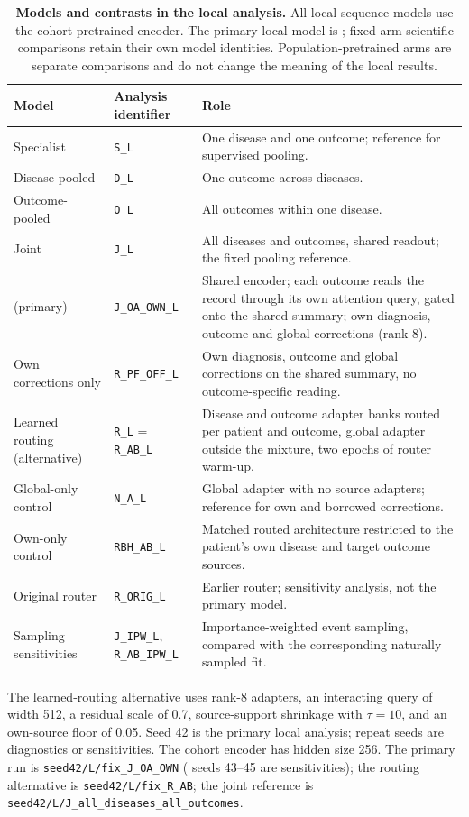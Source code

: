\begin{table}[htbp]
\centering\small
\caption{\textbf{Models and contrasts in the local analysis.}
All local sequence models use the cohort-pretrained encoder. The primary
local model is \opera{}; fixed-arm scientific comparisons retain their own
model identities. Population-pretrained arms are separate comparisons and do
not change the meaning of the local results.}
\label{tab:model-identity}
\begin{tabularx}{\textwidth}{@{}p{}p{}X@{}}
\toprule
Model & Analysis identifier & Role \\
\midrule
Specialist & \texttt{S\_L} & One disease and one outcome; reference for supervised pooling. \\
Disease-pooled & \texttt{D\_L} & One outcome across diseases. \\
Outcome-pooled & \texttt{O\_L} & All outcomes within one disease. \\
Joint & \texttt{J\_L} & All diseases and outcomes, shared readout; the fixed pooling reference. \\
\opera{} (primary) & \texttt{J\_OA\_OWN\_L} & Shared encoder; each outcome reads the record through its own attention query, gated onto the shared summary; own diagnosis, outcome and global corrections (rank 8). \\
Own corrections only & \texttt{R\_PF\_OFF\_L} & Own diagnosis, outcome and global corrections on the shared summary, no outcome-specific reading. \\
Learned routing (alternative) & \texttt{R\_L} = \texttt{R\_AB\_L} & Disease and outcome adapter banks routed per patient and outcome, global adapter outside the mixture, two epochs of router warm-up. \\
Global-only control & \texttt{N\_A\_L} & Global adapter with no source adapters; reference for own and borrowed corrections. \\
Own-only control & \texttt{RBH\_AB\_L} & Matched routed architecture restricted to the patient's own disease and target outcome sources. \\
Original router & \texttt{R\_ORIG\_L} & Earlier router; sensitivity analysis, not the primary model. \\
Sampling sensitivities & \texttt{J\_IPW\_L}, \texttt{R\_AB\_IPW\_L} & Importance-weighted event sampling, compared with the corresponding naturally sampled fit. \\
\bottomrule
\end{tabularx}
\par\smallskip\footnotesize
The learned-routing alternative uses rank-8 adapters, an interacting query of width 512,
a residual scale of 0.7, source-support shrinkage with $\tau=10$, and an
own-source floor of 0.05. Seed 42 is the primary local analysis; repeat seeds
are diagnostics or sensitivities. The cohort encoder has hidden size 256.
The primary run is \texttt{seed42/L/fix\_J\_OA\_OWN} (\opera{} seeds 43--45 are
sensitivities); the routing alternative is \texttt{seed42/L/fix\_R\_AB}; the joint reference is
\texttt{seed42/L/J\_all\_diseases\_all\_outcomes}.
\end{table}
